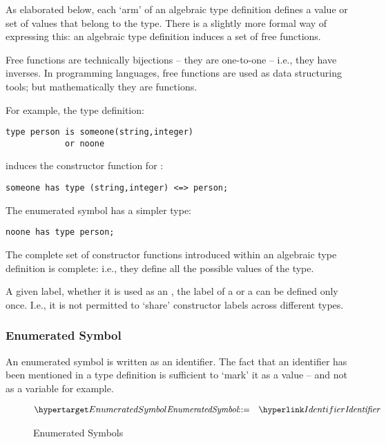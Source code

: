 \begin{aside}
As elaborated below, each `arm' of an algebraic type definition defines a value or set of values that belong to the type. There is a slightly more formal way of expressing this: an algebraic type definition induces a set of free functions. 

\begin{aside}
Free functions are technically bijections -- they are one-to-one -- i.e., they have inverses. In programming languages, free functions are used as data structuring tools; but mathematically they are functions.
\end{aside}

For example, the type definition:
\begin{lstlisting}
type person is someone(string,integer) 
            or noone
\end{lstlisting}
induces the constructor function for :
\begin{lstlisting}
someone has type (string,integer) <=> person;
\end{lstlisting}
The enumerated symbol has a simpler type:
\begin{lstlisting}
noone has type person;
\end{lstlisting}
The complete set of constructor functions introduced within an algebraic type definition is complete: i.e., they define all the possible values of the type.
\end{aside}

\begin{aside}
A given label, whether it is used as an , the label of a  or a  can be defined only once. I.e., it is not permitted to `share' constructor labels across different types.
\end{aside}

\subsubsection{Enumerated Symbol}
\label{enumSymbol}
An enumerated symbol is written as an identifier. The fact that an identifier has been mentioned in a type definition is sufficient to `mark' it as a value -- and not as a variable for example.
\begin{figure}[htbp]
\begin{eqnarray*}
\ntDef{EnumeratedSymbol}&\arrow&\ntRef{Identifier}
\end{eqnarray*}
\caption{Enumerated Symbols}
\label{enumSymbolFig}
\end{figure}

